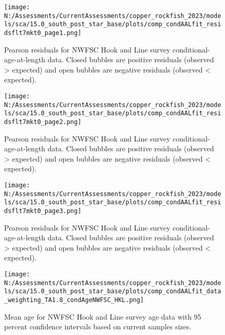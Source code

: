 \documentclass[11pt,
  english,
  letterpaper,
]{article}
\begin{document}
\pagebreak

\begin{figure}
\centering
\texttt{[image: N:/Assessments/CurrentAssessments/copper\_rockfish\_2023/models/sca/15.0\_south\_post\_star\_base/plots/comp\_condAALfit\_residsflt7mkt0\_page1.png]}
\caption{Pearson residuals for NWFSC Hook and Line survey conditional-age-at-length data. Closed bubbles are positive residuals (observed \textgreater{} expected) and open bubbles are negative residuals (observed \textless{} expected).\label{fig:nwfsc-hkl-age-pearson-1}}
\end{figure}

\pagebreak

\begin{figure}
\centering
\texttt{[image: N:/Assessments/CurrentAssessments/copper\_rockfish\_2023/models/sca/15.0\_south\_post\_star\_base/plots/comp\_condAALfit\_residsflt7mkt0\_page2.png]}
\caption{Pearson residuals for NWFSC Hook and Line survey conditional-age-at-length data. Closed bubbles are positive residuals (observed \textgreater{} expected) and open bubbles are negative residuals (observed \textless{} expected).\label{fig:nwfsc-hkl-age-pearson-2}}
\end{figure}

\pagebreak

\begin{figure}
\centering
\texttt{[image: N:/Assessments/CurrentAssessments/copper\_rockfish\_2023/models/sca/15.0\_south\_post\_star\_base/plots/comp\_condAALfit\_residsflt7mkt0\_page3.png]}
\caption{Pearson residuals for NWFSC Hook and Line survey conditional-age-at-length data. Closed bubbles are positive residuals (observed \textgreater{} expected) and open bubbles are negative residuals (observed \textless{} expected).\label{fig:nwfsc-hkl-age-pearson-3}}
\end{figure}

\pagebreak

\begin{figure}
\centering
\texttt{[image: N:/Assessments/CurrentAssessments/copper\_rockfish\_2023/models/sca/15.0\_south\_post\_star\_base/plots/comp\_condAALfit\_data\_weighting\_TA1.8\_condAgeNWFSC\_HKL.png]}
\caption{Mean age for NWFSC Hook and Line survey age data with 95 percent confidence intervals based on current samples sizes.\label{fig:nwfsc-hkl-mean-age-fit}}
\end{figure}
\end{document}
